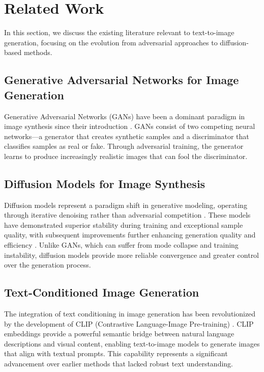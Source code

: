 \section{Related Work}
\label{sec:related_work}

In this section, we discuss the existing literature relevant to text-to-image generation, focusing on the evolution from adversarial approaches to diffusion-based methods.

\subsection{Generative Adversarial Networks for Image Generation}

Generative Adversarial Networks (GANs) have been a dominant paradigm in image synthesis since their introduction \cite{goodfellow2014generative}. GANs consist of two competing neural networks—a generator that creates synthetic samples and a discriminator that classifies samples as real or fake. Through adversarial training, the generator learns to produce increasingly realistic images that can fool the discriminator.

\subsection{Diffusion Models for Image Synthesis}

Diffusion models represent a paradigm shift in generative modeling, operating through iterative denoising rather than adversarial competition \cite{ho2020denoising}. These models have demonstrated superior stability during training and exceptional sample quality, with subsequent improvements further enhancing generation quality and efficiency \cite{nichol2021improved}. Unlike GANs, which can suffer from mode collapse and training instability, diffusion models provide more reliable convergence and greater control over the generation process.

\subsection{Text-Conditioned Image Generation}

The integration of text conditioning in image generation has been revolutionized by the development of CLIP (Contrastive Language-Image Pre-training) \cite{radford2021learning}. CLIP embeddings provide a powerful semantic bridge between natural language descriptions and visual content, enabling text-to-image models to generate images that align with textual prompts. This capability represents a significant advancement over earlier methods that lacked robust text understanding.
